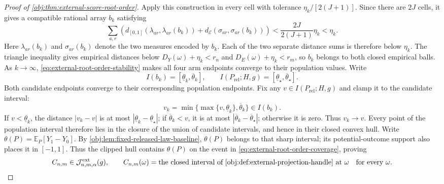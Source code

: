 \begin{proof}[Proof of \cref{obj:thm:external-score-root-order}]
Apply this construction in every cell with tolerance \(\eta_k/[2(J+1)]\). Since there are \(2J\) cells, it gives a compatible rational array \(b_k\) satisfying
\[
\sum_{a,r}\!\left(d_{[0,1]}(\lambda_{ar},\lambda_{ar}(b_k))
+d_{\mathcal E}(\sigma_{ar},\sigma_{ar}(b_k))\right)
<\frac{2J}{2(J+1)}\eta_k<\eta_k.
\]
Here \(\lambda_{ar}(b_k)\) and \(\sigma_{ar}(b_k)\) denote the two measures encoded by \(b_k\). Each of the two separate distance sums is therefore below \(\eta_k\). The triangle inequality gives empirical distances below \(D_Y(\omega)+\eta_k<r_n\) and \(D_E(\omega)+\eta_k<r_m\), so \(b_k\) belongs to both closed empirical balls. As \(k\to\infty\), \cref{eq:external-root-order-stability} makes all four arm endpoints converge to their population values. Write
\[
I(b_k)=[\underline\theta_k,\overline\theta_k],
\qquad
I(P_{\mathrm{rel}};H,g)=[\underline\theta_\star,\overline\theta_\star].
\]
Both candidate endpoints converge to their corresponding population endpoints. Fix any \(v\in I(P_{\mathrm{rel}};H,g)\) and clamp it to the candidate interval:
\[
v_k=\min\{\max\{v,\underline\theta_k\},\overline\theta_k\}\in I(b_k).
\]
If \(v<\underline\theta_k\), the distance \(|v_k-v|\) is at most \(|\underline\theta_k-\underline\theta_\star|\); if \(\overline\theta_k<v\), it is at most \(|\overline\theta_k-\overline\theta_\star|\); otherwise it is zero. Thus \(v_k\to v\). Every point of the population interval therefore lies in the closure of the union of candidate intervals, and hence in their closed convex hull. Write \(\theta(P)=\mathbb E_P[Y_1-Y_0]\). By \cref{obj:lem:fixed-released-law-baseline}, \(\theta(P)\) belongs to that sharp interval; its potential-outcome support also places it in \([-1,1]\). Thus the clipped hull contains \(\theta(P)\) on the event in \cref{eq:external-root-order-coverage}, proving
\[
C_{n,m}\in\mathcal J^{\mathrm{ext}}_{n,m,\alpha}(g),
\qquad
C_{n,m}(\omega)=\text{the closed interval of \cref{obj:def:external-projection-handle} at }\omega
\quad\text{for every }\omega. \label{eq:external-root-order-honesty}
\]


\end{proof}
